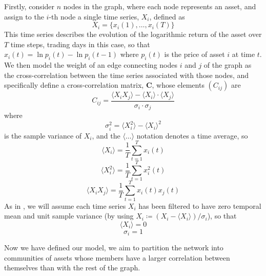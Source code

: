 \documentclass[12pt]{article}
\numberwithin{equation}{section}
\newcommand*\mean[1]{\langle#1\rangle}
\begin{document}
Firstly, consider $n$ nodes in the graph, where each node represents an asset, and assign to the $i$-th node a single time series, $X_{i}$, defined as
\begin{equation}
\label{eq:singleTimeSeries}
	X_{i} = \{x_{i}(1),\dots,x_{i}(T)\}
\end{equation}
This time series describes the evolution of the logarithmic return of the asset over $T$ time steps, trading days in this case, so that $x_{i}(t) = \ln p_{i}(t) - \ln p_{i}(t-1)$ where $p_{i}(t)$ is the price of asset $i$ at time $t$. We then model the weight of an edge connecting nodes $i$ and $j$ of the graph as the cross-correlation between the time series associated with those nodes, and specifically define a cross-correlation matrix, $\mathbf{C}$, whose elements $(C_{ij})$ are
\begin{equation}
\label{eq:crossCorrelationMatrix}
	C_{ij} = \frac{\mean{X_{i} X_{j}} - \mean{X_{i}} \cdot \mean{X_{j}}}{\sigma_{i} \cdot \sigma_{j}}
\end{equation}
where
\begin{equation}
\label{eq:sampleVariance}
	\sigma_{i}^{2} = \mean{X_{i}^{2}} - \mean{X_{i}}^{2}
\end{equation}
is the sample variance of $X_{i}$, and the $\mean{\dots}$ notation denotes a time average, so
\begin{equation}
\label{eq:temporalMean}
	\mean{X_{i}} = \frac{1}{T} \sum_{t=1}^{T} x_{i}(t)
\end{equation}
\begin{equation}
\label{eq:temporalMeanSquare}
	\mean{X_{i}^{2}} = \frac{1}{T} \sum_{t=1}^{T} x_{i}^{2}(t)
\end{equation}
\begin{equation}
\label{eq:temporalMeanProduct}
	\mean{X_{i}X_{j}} = \frac{1}{T} \sum_{t=1}^{T} x_{i}(t)x_{j}(t)
\end{equation}
As in \cite{MG13}, we will assume each time series $X_{i}$ has been filtered to have zero temporal mean and unit sample variance (by using $X_{i} \coloneqq (X_{i} - \mean{X_{i}}) / \sigma_{i}$), so that
\begin{equation}
\label{eq:zeroSampleMean}
	\mean{X_{i}} = 0
\end{equation}
\begin{equation}
\label{eq:unitSampleVariance}
	\sigma_{i} = 1
\end{equation}

Now we have defined our model, we aim to partition the network into communities of assets whose members have a larger correlation between themselves than with the rest of the graph.
\end{document}
